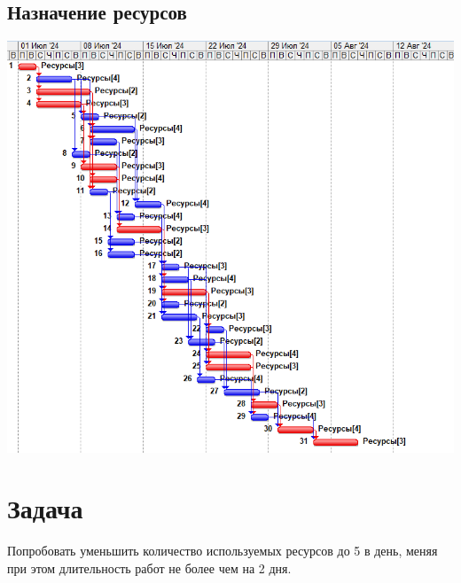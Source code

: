\documentclass[14pt]{article}
\begin{document}
	\subsection{Назначение ресурсов}
	\includegraphics[width=\textwidth]{../img/init_resource_manage.png}
\section{Задача}
	Попробовать уменьшить количество используемых ресурсов до 5 в день, меняя при этом длительность работ не более чем на 2 дня.
\end{document}
